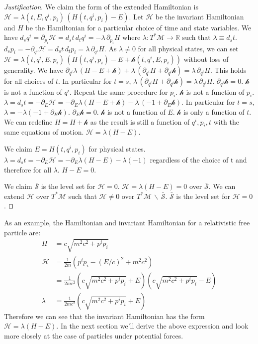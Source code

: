 \documentclass[smallextended]{svjour3}
\numberwithin{equation}{section}
\newenvironment{justification}{\emph{Justification}.}{\hfill\(\qed\)}
\theoremstyle{definition}
\newenvironment{justification}{\emph{Justification}.}{\qed}
\begin{document}
\begin{justification}
	We claim the form of the extended Hamiltonian is $\mathcal{H} = \lambda(t,E,q^i,p_i) \, (H(t,q^i,p_i) - E)$. Let $\mathcal{H}$ be the invariant Hamiltonian and $H$ be the Hamiltonian for a particular choice of time and state variables. We have $d_s q^i = \partial_{p_i} \mathcal{H} = d_s t \, d_t q^i = - \lambda \, \partial_{p_i} H$ where $\lambda : T^*\mathcal{M} \rightarrow \mathbb{R}$ such that $\lambda \equiv d_s t$. $d_s p_i = - \partial_{q^i} \mathcal{H} = d_s t \, d_t p_i = \lambda \, \partial_{q^i} H$. As $\lambda \neq 0$ for all physical states, we can set $\mathcal{H} = \lambda(t,q^i,E,p_i) \, (H(t,q^i,p_i) - E + \mathcal{h}(t,q^i,E,p_i))$ without loss of generality. We have $\partial_{q^i} \lambda \, (H - E + \mathcal{h}) + \lambda \, (\partial_{q^i} H + \partial_{q^i} \mathcal{h}) = \lambda \, \partial_{q^i} H$. This holds for all choices of $t$. In particular for $t=s$, $\lambda \, (\partial_{q^i} H + \partial_{q^i} \mathcal{h}) = \lambda \, \partial_{q^i} H$. $\partial_{q^i} \mathcal{h} = 0$. $\mathcal{h}$ is not a function of $q^i$. Repeat the same procedure for $p_i$. $\mathcal{h}$ is not a function of $p_i$. $\lambda = d_s t = - \partial_E \mathcal{H} = - \partial_{E} \lambda (H - E + \mathcal{h}) - \lambda \, (-1 + \partial_{E} \mathcal{h})$. In particular for $t=s$, $\lambda = - \lambda (-1 + \partial_{E} \mathcal{h})$. $\partial_{E} \mathcal{h} = 0$. $\mathcal{h}$ is not a function of $E$. $\mathcal{h}$ is only a function of $t$. We can redefine $H = H + \mathcal{h}$ as the result is still a function of $q^i, p_i , t$ with the same equations of motion. $\mathcal{H}=\lambda (H - E)$.
	
	We claim $E = H(t,q^i,p_i)$ for physical states. $\lambda = d_s t = - \partial_E \mathcal{H} = - \partial_{E} \lambda (H - E) - \lambda (-1)$ regardless of the choice of t and therefore for all $\lambda$. $H - E = 0$. 
	
	We claim $\bar{\mathcal{S}}$ is the level set for $\mathcal{H} = 0$. $\mathcal{H} = \lambda (H - E) = 0$ over $\bar{\mathcal{S}}$. We can extend $\mathcal{H}$ over $T^* \mathcal{M}$ such that $\mathcal{H} \neq 0$ over $T^*\mathcal{M} \,\backslash\, \bar{\mathcal{S}}$. $\bar{\mathcal{S}}$ is the level set for $\mathcal{H} = 0$.
\end{justification}

As an example, the Hamiltonian and invariant Hamiltonian for a relativistic free particle are:
\begin{equation}\label{free_hamiltonians}
\begin{aligned}
H &= c \sqrt{m^2 c^2 + p^i p_i} \\
\mathcal{H} &= \frac{1}{2m} ( p^i p_i - (E/c)^2 + m^2c^2) \\
 &= \frac{1}{2mc^2} (c \sqrt{m^2 c^2 + p^i p_i} + E) (c \sqrt{m^2 c^2 + p^i p_i} - E) \\
\lambda &= \frac{1}{2mc^2} (c \sqrt{m^2 c^2 + p^i p_i} + E)
\end{aligned}
\end{equation}
Therefore we can see that the invariant Hamiltonian has the form $\mathcal{H}=\lambda (H - E)$. In the next section we'll derive the above expression and look more closely at the case of particles under potential forces.
\end{document}
